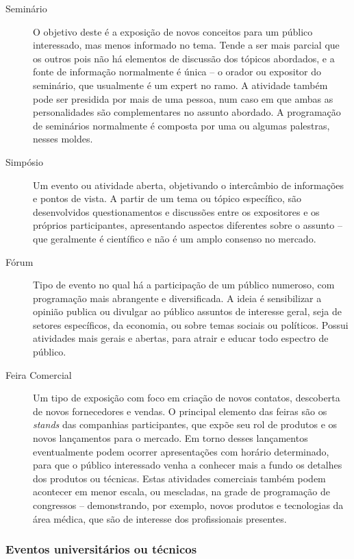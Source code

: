 \documentclass[12pt,a4paper,twoside,hyphens,english,brazil]{abntex2}
\begin{document}
\begin{description}
	\item[Seminário] O objetivo deste é a exposição de novos conceitos para um público interessado, mas menos informado no tema. Tende a ser mais parcial que os outros pois não há elementos de discussão dos tópicos abordados, e a fonte de informação normalmente é única -- o orador ou expositor do seminário, que usualmente é um expert no ramo. A atividade também pode ser presidida por mais de uma pessoa, num caso em que ambas as personalidades são complementares no assunto abordado. A programação de seminários normalmente é composta por uma ou algumas palestras, nesses moldes.
					
	\item[Simpósio] Um evento ou atividade aberta, objetivando o intercâmbio de informações e pontos de vista. A partir de um tema ou tópico específico, são desenvolvidos questionamentos e discussões entre os expositores e os próprios participantes, apresentando aspectos diferentes sobre o assunto -- que geralmente é científico e não é um amplo consenso no mercado. %
	
	\item[Fórum] Tipo de evento no qual há a participação de um público numeroso, com programação mais abrangente e diversificada. A ideia é sensibilizar a opinião publica ou divulgar ao público assuntos de interesse geral, seja de setores específicos, da economia, ou sobre temas sociais ou políticos. Possui atividades mais gerais e abertas, para atrair e educar todo espectro de público.
	
	\item[Feira Comercial] Um tipo de exposição com foco em criação de novos contatos, descoberta de novos fornecedores e vendas. O principal elemento das feiras são os \emph{stands} das companhias participantes, que expõe seu rol de produtos e os novos lançamentos para o mercado. Em torno desses lançamentos eventualmente podem ocorrer apresentações com horário determinado, para que o público interessado venha a conhecer mais a fundo os detalhes dos produtos ou técnicas. Estas atividades comerciais também podem acontecer em menor escala, ou mescladas, na grade de programação de congressos -- demonstrando, por exemplo, novos produtos e tecnologias da área médica, que são de interesse dos profissionais presentes.
\end{description}

\subsubsection*{Eventos universitários ou técnicos}
\end{document}
